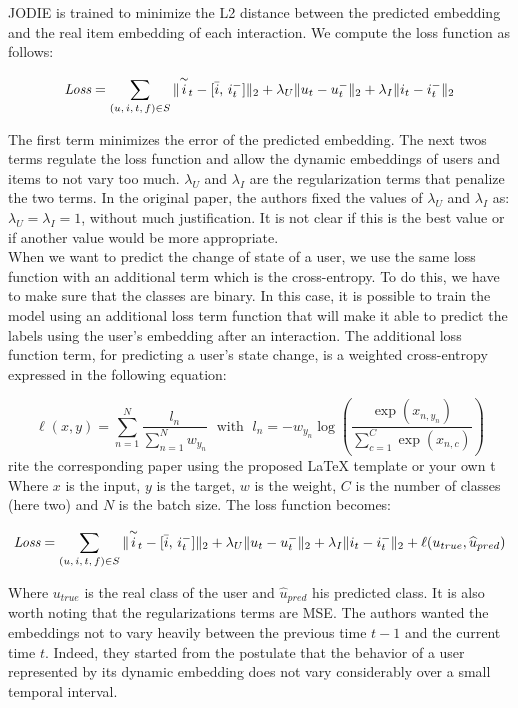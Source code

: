 JODIE is trained to minimize the L2 distance between the predicted embedding and the real item embedding of each interaction. We compute the loss function as follows:

\begin{equation}
    \textit{Loss} = \sum_{(u,\,i,\,t,\,f) \in S} \| \overset{\sim}{i}_t - [\Bar{i},\,i_t^-] \|_2 + \lambda_U \|u_t - u_t^-\|_2 + \lambda_I \|i_t - i_t^-\|_2
\end{equation}

The first term minimizes the error of the predicted embedding. The next twos terms regulate the loss function and allow the dynamic embeddings of users and items to not vary too much. $\lambda_U$ and $\lambda_I$ are the regularization terms that penalize the two terms. In the original paper, the authors fixed the values of $\lambda_U$ and $\lambda_I$ as: $\lambda_U = \lambda_I = 1$, without much justification. It is not clear if this is the best value or if another value would be more appropriate. \\

When we want to predict the change of state of a user, we use the same loss function with an additional term which is the cross-entropy. To do this, we have to make sure that the classes are binary. In this case, it is possible to train the model using an additional loss term function that will make it able to predict the labels using the user's embedding after an interaction. The additional loss function term, for predicting a user's state change, is a weighted cross-entropy expressed in the following equation:

\begin{equation}
    \ell(x,y) = \sum_{n=1}^N \frac{l_n}{\sum_{n=1}^N w_{y_n}} \; \text{ with } \;
    l_n = -w_{y_n} \log \left ( \frac{\exp(x_{n,y_n})}{\sum_{c=1}^C \exp(x_{n,c})} \right )
\end{equation}
rite the corresponding paper using the proposed LaTeX template or your own t
Where $x$ is the input, $y$ is the target, $w$ is the weight, $C$ is the number of classes (here two) and $N$ is the batch size. The loss function becomes:

\begin{equation}
    \textit{Loss} = \sum_{(u,\,i,\,t,\,f) \in S} \| \overset{\sim}{i}_t - [\Bar{i},\,i_t^-] \|_2 + \lambda_U \|u_t - u_t^-\|_2 + \lambda_I \|i_t - i_t^-\|_2 + \ell (u_{true}, \widehat u_{pred})
\end{equation}

Where $u_{true}$ is the real class of the user and $\widehat u_{pred}$ his predicted class. It is also worth noting that the regularizations terms are MSE. The authors wanted the embeddings not to vary heavily between the previous time $t-1$ and the current time $t$. Indeed, they started from the postulate that the behavior of a user represented by its dynamic embedding does not vary considerably over a small temporal interval.\\

